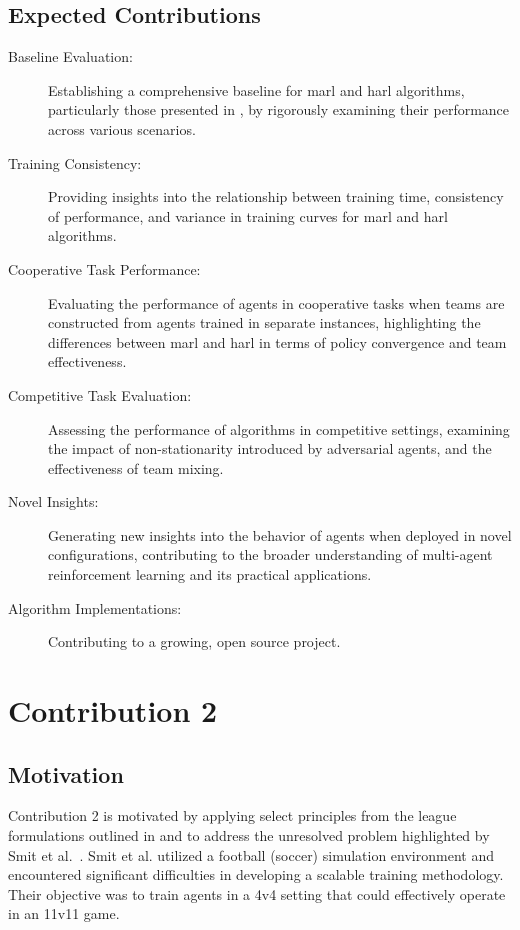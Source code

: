 \subsection{Expected Contributions}
\begin{description}
    \item[Baseline Evaluation:] 
    Establishing a comprehensive baseline for \gls{marl} and \gls{harl} 
    algorithms, particularly those presented in \cite{zhong2024}, 
    by rigorously examining their performance across various scenarios.
    \item[Training Consistency:] 
    Providing insights into the relationship between training time, 
    consistency of performance, and variance in training curves for 
    \gls{marl} and \gls{harl} algorithms.
    \item[Cooperative Task Performance:] 
    Evaluating the performance of agents in cooperative tasks when teams are 
    constructed from agents trained in separate instances, highlighting the 
    differences between \gls{marl} and \gls{harl} in terms of policy 
    convergence and team effectiveness.
    \item[Competitive Task Evaluation:] 
    Assessing the performance of algorithms in competitive settings, 
    examining the impact of non-stationarity introduced by adversarial agents, 
    and the effectiveness of team mixing.
    \item[Novel Insights:] 
    Generating new insights into the behavior of agents when deployed in novel 
    configurations, contributing to the broader understanding of 
    multi-agent reinforcement learning and its practical applications.
    \item[Algorithm Implementations:] 
    Contributing to a growing, open source project.
\end{description}



\section{Contribution 2}

\subsection{Motivation}
Contribution 2 is motivated by applying select principles from the league formulations outlined 
in \cite{vinyals2019} and \cite{berner2019} to address the unresolved problem highlighted by 
Smit et al.~\cite{smit2023}. Smit et al. utilized a football (soccer) simulation environment and 
encountered significant difficulties in developing a scalable training methodology. Their 
objective was to train agents in a 4v4 setting that could effectively operate in an 11v11 game.

